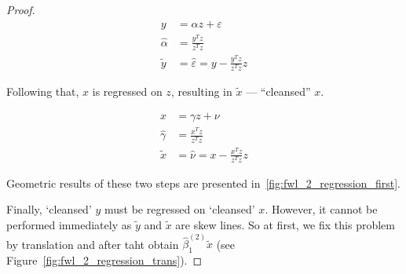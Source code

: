 \documentclass[nobib]{tufte-handout}
\begin{document}
\begin{proof}
\begin{equation}\label{eq:fwl_2_y_clean}
\begin{aligned}
y &= \alpha z + \varepsilon \\
\hat\alpha &= \frac{y^T z}{z^T z} \\
\tilde{y} &= \hat\varepsilon = y - \frac{y^T z}{z^T z}z
\end{aligned}
\end{equation}

Following that, $x$ is regressed on $z$, resulting in $\tilde{x}$ — ``cleansed'' $x$.

\begin{equation}\label{eq:fwl_2_x_clean}
\begin{aligned}
x &= \gamma z + \nu \\
\hat\gamma &= \frac{x^T z}{z^T z} \\
\tilde{x} &= \hat\nu = x - \frac{x^T z}{z^T z}z
\end{aligned}
\end{equation}

Geometric results of these two steps are presented in~\ref{fig:fwl_2_regression_first}.

Finally, `cleansed' $y$ must be regressed on `cleansed' $x$. However, it cannot be performed immediately as $\tilde{y}$ and $\tilde{x}$ are skew lines.
So at first, we fix this problem by translation and after taht obtain $\hat\beta_1^{(2)}\tilde x$ (see Figure~\ref{fig:fwl_2_regression_trans}).


\end{proof}
\end{document}
